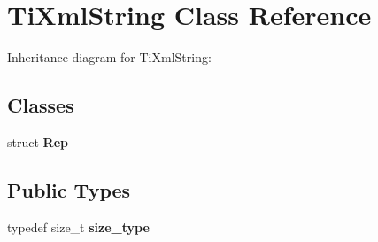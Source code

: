 \hypertarget{class_ti_xml_string}{
\section{\-Ti\-Xml\-String \-Class \-Reference}
\label{class_ti_xml_string}
}


\-Inheritance diagram for \-Ti\-Xml\-String\-:
\subsection*{\-Classes}
\begin{DoxyCompactItemize}
\item 
struct {\bfseries \-Rep}
\end{DoxyCompactItemize}
\subsection*{\-Public \-Types}
\begin{DoxyCompactItemize}
\item 
\hypertarget{class_ti_xml_string_abeb2c1893a04c17904f7c06546d0b971}{
typedef size\-\_\-t {\bfseries size\-\_\-type}}
\label{class_ti_xml_string_abeb2c1893a04c17904f7c06546d0b971}

\end{DoxyCompactItemize}
